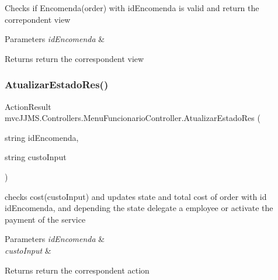 Checks if Encomenda(order) with id\+Encomenda is valid and return the correpondent view 


\begin{DoxyParams}{Parameters}
{\em id\+Encomenda} & \\
\hline
\end{DoxyParams}
\begin{DoxyReturn}{Returns}
return the correspondent view
\end{DoxyReturn}
\mbox{\label{classmvc_j_j_m_s_1_1_controllers_1_1_menu_funcionario_controller_a9eaa1e9f78c031cb0431158442e5f0c2}} 
\subsubsection{\texorpdfstring{Atualizar\+Estado\+Res()}{AtualizarEstadoRes()}}
{\footnotesize\ttfamily Action\+Result mvc\+J\+J\+M\+S.\+Controllers.\+Menu\+Funcionario\+Controller.\+Atualizar\+Estado\+Res (\begin{DoxyParamCaption}\item[{string}]{id\+Encomenda,  }\item[{string}]{custo\+Input }\end{DoxyParamCaption})\hspace{0.3cm}{\ttfamily [inline]}}



checks cost(custo\+Input) and updates state and total cost of order with id id\+Encomenda, and depending the state delegate a employee or activate the payment of the service 


\begin{DoxyParams}{Parameters}
{\em id\+Encomenda} & \\
\hline
{\em custo\+Input} & \\
\hline
\end{DoxyParams}
\begin{DoxyReturn}{Returns}
return the correspondent action
\end{DoxyReturn}
\mbox{\label{classmvc_j_j_m_s_1_1_controllers_1_1_menu_funcionario_controller_aa3969c230e6f472ebe0241d6399e29c9}} 
